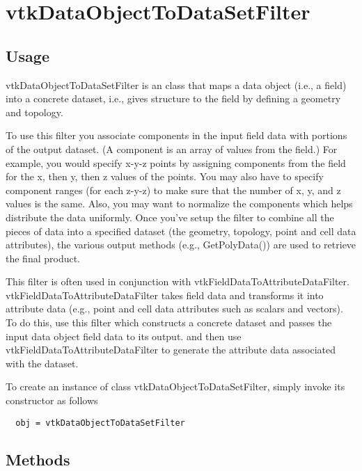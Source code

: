 \section{vtkDataObjectToDataSetFilter}

\subsection{Usage}

 vtkDataObjectToDataSetFilter is an class that maps a data object (i.e., a field)
 into a concrete dataset, i.e., gives structure to the field by defining a
 geometry and topology.

 To use this filter you associate components in the input field data with
 portions of the output dataset. (A component is an array of values from
 the field.) For example, you would specify x-y-z points by assigning 
 components from the field for the x, then y, then z values of the points.
 You may also have to specify component ranges (for each z-y-z) to make 
 sure that the number of x, y, and z values is the same. Also, you may 
 want to normalize the components which helps distribute the data 
 uniformly. Once you've setup the filter to combine all the pieces of 
 data into a specified dataset (the geometry, topology, point and cell 
 data attributes), the various output methods (e.g., GetPolyData()) are
 used to retrieve the final product.

 This filter is often used in conjunction with
 vtkFieldDataToAttributeDataFilter.  vtkFieldDataToAttributeDataFilter
 takes field data and transforms it into attribute data (e.g., point and
 cell data attributes such as scalars and vectors).  To do this, use this
 filter which constructs a concrete dataset and passes the input data
 object field data to its output. and then use
 vtkFieldDataToAttributeDataFilter to generate the attribute data associated
 with the dataset.

To create an instance of class vtkDataObjectToDataSetFilter, simply
invoke its constructor as follows
\begin{verbatim}
  obj = vtkDataObjectToDataSetFilter
\end{verbatim}
\subsection{Methods}

